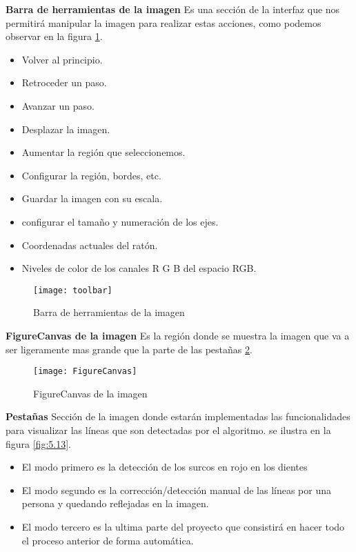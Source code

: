 \textbf{Barra de herramientas de la imagen}
Es una sección de la interfaz que nos permitirá manipular la imagen para realizar estas acciones, como podemos observar en la figura \ref{fig:5.11}.

\begin{itemize}
\item Volver al principio. 
\item Retroceder un paso.
\item Avanzar un paso.
\item Desplazar la imagen.
\item Aumentar la región que seleccionemos.
\item Configurar la región, bordes, etc.
\item Guardar la imagen con su escala.
\item configurar el tamaño y numeración de los ejes.
\item Coordenadas actuales del ratón.
\item Niveles de color de los canales R G B del espacio RGB.
\end{itemize}

\begin{figure}[h]
\centering
\texttt{[image: toolbar]}
\caption{Barra de herramientas de la imagen}\label{fig:5.11}
\end{figure}


\textbf{FigureCanvas de la imagen}
Es la región donde se muestra la imagen que va a ser ligeramente mas grande que la parte de las pestañas \ref{fig:5.12}.
\begin{figure}[h]
\centering
\texttt{[image: FigureCanvas]}
\caption{FigureCanvas de la imagen}
\label{fig:5.12}
\end{figure}


\textbf{Pestañas}
Sección de la imagen donde estarán implementadas las funcionalidades para visualizar las líneas que son detectadas por el algoritmo. se ilustra en la figura \ref{fig:5.13}.
\begin{itemize}
\item El modo primero es la detección de los surcos en rojo en los dientes 
\item El modo segundo es la corrección/detección manual de las líneas por una persona y quedando reflejadas en la imagen.
\item El modo tercero es la ultima parte del proyecto que consistirá en hacer todo el proceso anterior de forma automática.
\end{itemize}

